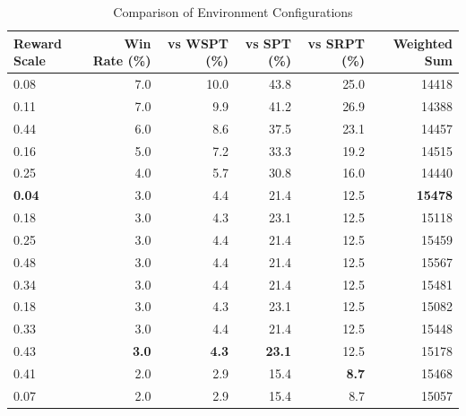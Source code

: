 \begin{table}[htbp]%
\centering%
\begin{tabular}{lrrrrr}%
\toprule%
\textbf{Reward Scale}&\textbf{Win Rate (\%)}&\textbf{vs WSPT (\%)}&\textbf{vs SPT (\%)}&\textbf{vs SRPT (\%)}&\textbf{Weighted Sum}\\%
\midrule%
0.08&7.0&10.0&43.8&25.0&14418\\%
0.11&7.0&9.9&41.2&26.9&14388\\%
0.44&6.0&8.6&37.5&23.1&14457\\%
0.16&5.0&7.2&33.3&19.2&14515\\%
0.25&4.0&5.7&30.8&16.0&14440\\%
\textbf{0.04}&3.0&4.4&21.4&12.5&\textbf{15478}\\%
0.18&3.0&4.3&23.1&12.5&15118\\%
0.25&3.0&4.4&21.4&12.5&15459\\%
0.48&3.0&4.4&21.4&12.5&15567\\%
0.34&3.0&4.4&21.4&12.5&15481\\%
0.18&3.0&4.3&23.1&12.5&15082\\%
0.33&3.0&4.4&21.4&12.5&15448\\%
0.43&\textbf{3.0}&\textbf{4.3}&\textbf{23.1}&12.5&15178\\%
0.41&2.0&2.9&15.4&\textbf{8.7}&15468\\%
0.07&2.0&2.9&15.4&8.7&15057\\%
\bottomrule%
\end{tabular}%
\caption{Comparison of Environment Configurations}%
\label{tab:environment}%
\end{table}